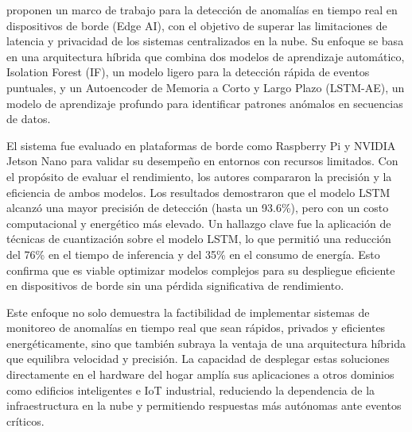 \citeauthor{reis2025edge} \citeyear{reis2025edge} proponen un marco de trabajo para la detección de anomalías en tiempo real en dispositivos de borde (Edge AI), con el objetivo de superar las limitaciones de latencia y privacidad de los sistemas centralizados en la nube. Su enfoque se basa en una arquitectura híbrida que combina dos modelos de aprendizaje automático, Isolation Forest (IF), un modelo ligero para la detección rápida de eventos puntuales, y un Autoencoder de Memoria a Corto y Largo Plazo (LSTM-AE), un modelo de aprendizaje profundo para identificar patrones anómalos en secuencias de datos.

El sistema fue evaluado en plataformas de borde como Raspberry Pi y NVIDIA Jetson Nano para validar su desempeño en entornos con recursos limitados. Con el propósito de evaluar el rendimiento, los autores compararon la precisión y la eficiencia de ambos modelos. Los resultados demostraron que el modelo LSTM alcanzó una mayor precisión de detección (hasta un 93.6\%), pero con un costo computacional y energético más elevado. Un hallazgo clave fue la aplicación de técnicas de cuantización sobre el modelo LSTM, lo que permitió una reducción del 76\% en el tiempo de inferencia y del 35\% en el consumo de energía. Esto confirma que es viable optimizar modelos complejos para su despliegue eficiente en dispositivos de borde sin una pérdida significativa de rendimiento.

Este enfoque no solo demuestra la factibilidad de implementar sistemas de monitoreo de anomalías en tiempo real que sean rápidos, privados y eficientes energéticamente, sino que también subraya la ventaja de una arquitectura híbrida que equilibra velocidad y precisión. La capacidad de desplegar estas soluciones directamente en el hardware del hogar amplía sus aplicaciones a otros dominios como edificios inteligentes e IoT industrial, reduciendo la dependencia de la infraestructura en la nube y permitiendo respuestas más autónomas ante eventos críticos.

